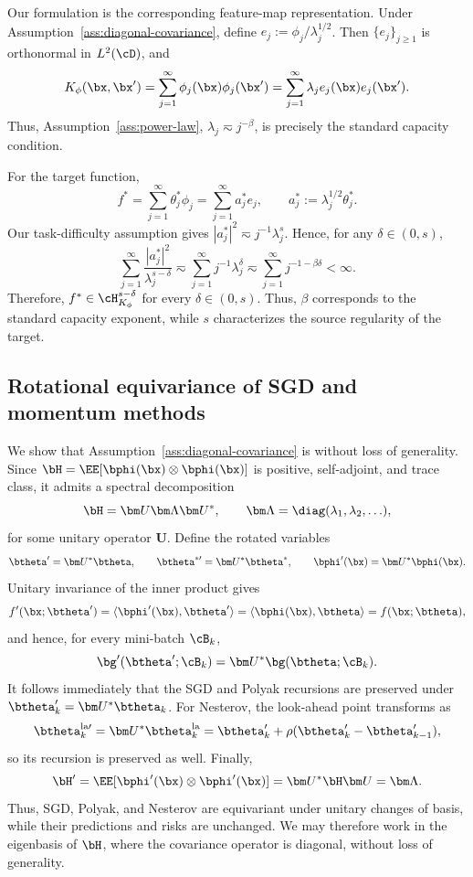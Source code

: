 \documentclass[11pt]{article}
\newcommand{\la}{\mathrm{la}}
\begin{document}
Our formulation is the corresponding feature-map representation. Under Assumption~\ref{ass:diagonal-covariance}, define \(e_j:=\phi_j/\lambda_j^{1/2}\). Then \(\{e_j\}_{j\geq1}\) is orthonormal in \(L^2(\cD)\), and
\[
K_\phi(\bx,\bx')
=
\sum_{j=1}^\infty \phi_j(\bx)\phi_j(\bx')
=
\sum_{j=1}^\infty \lambda_j e_j(\bx)e_j(\bx').
\]
Thus, Assumption~\ref{ass:power-law}, \(\lambda_j\eqsim j^{-\beta}\), is precisely the standard capacity condition.

For the target function,
\[
f^*
=
\sum_{j=1}^\infty \theta_j^*\phi_j
=
\sum_{j=1}^\infty a_j^*e_j,
\qquad
a_j^*:=\lambda_j^{1/2}\theta_j^*.
\]
Our task-difficulty assumption gives \(|a_j^*|^2\eqsim j^{-1}\lambda_j^s\). Hence, for any \(\delta\in(0,s)\),
\[
\sum_{j=1}^\infty
\frac{|a_j^*|^2}{\lambda_j^{s-\delta}}
\eqsim
\sum_{j=1}^\infty j^{-1}\lambda_j^\delta
\eqsim
\sum_{j=1}^\infty j^{-1-\beta\delta}
<\infty.
\]
Therefore, \(f^*\in\cH_{K_\phi}^{s-\delta}\) for every \(\delta\in(0,s)\). Thus, \(\beta\) corresponds to the standard capacity exponent, while \(s\) characterizes the source regularity of the target.

\subsection{Rotational equivariance of SGD and momentum methods}
\label{app:subsec:rotation invariant}

We show that Assumption~\ref{ass:diagonal-covariance} is without loss of generality. Since \(\bH=\EE[\bphi(\bx)\otimes\bphi(\bx)]\) is positive, self-adjoint, and trace class, it admits a spectral decomposition
\[
\bH=\bm U\bm\Lambda\bm U^*,
\qquad
\bm\Lambda=\diag(\lambda_1,\lambda_2,\ldots),
\]
for some unitary operator \(\bm U\). Define the rotated variables
\[
\btheta'=\bm U^*\btheta,\qquad
\btheta^{*\prime}=\bm U^*\btheta^*,\qquad
\bphi'(\bx)=\bm U^*\bphi(\bx).
\]
Unitary invariance of the inner product gives
\[
f'(\bx;\btheta')=\langle\bphi'(\bx),\btheta'\rangle
=\langle\bphi(\bx),\btheta\rangle=f(\bx;\btheta),
\]
and hence, for every mini-batch \(\cB_k\),
\[
\bg'(\btheta';\cB_k)=\bm U^*\bg(\btheta;\cB_k).
\]
It follows immediately that the SGD and Polyak recursions are preserved under \(\btheta_k'=\bm U^*\btheta_k\). For Nesterov, the look-ahead point transforms as
\[
\btheta_k^{\la\prime}
=\bm U^*\btheta_k^{\la}
=\btheta_k'+\rho(\btheta_k'-\btheta_{k-1}'),
\]
so its recursion is preserved as well. Finally,
\[
\bH'=\EE[\bphi'(\bx)\otimes\bphi'(\bx)]
=\bm U^*\bH\bm U
=\bm\Lambda.
\]
Thus, SGD, Polyak, and Nesterov are equivariant under unitary changes of basis, while their predictions and risks are unchanged. We may therefore work in the eigenbasis of \(\bH\), where the covariance operator is diagonal, without loss of generality.
\end{document}
